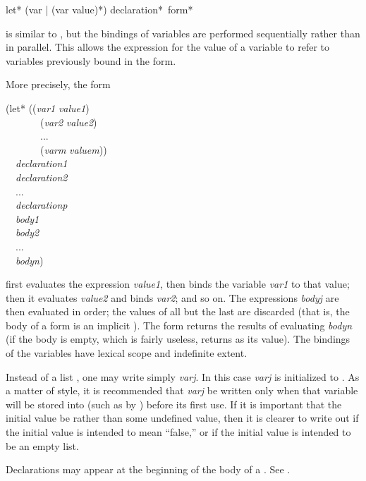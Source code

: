 \begin{defspec}
let* ({var | (var value)}*) {declaration}* {\,form}*

 is similar to , but the bindings of variables
are performed sequentially rather than in parallel.  This allows
the expression for the value of a variable to refer to variables
previously bound in the  form.

More precisely, the form
\begin{lisp}
(let* ((\emph{var1} \emph{value1}) \\
~~~~~~~(\emph{var2} \emph{value2}) \\
~~~~~~~... \\
~~~~~~~(\emph{varm} \emph{valuem})) \\
~~\emph{declaration1} \\
~~\emph{declaration2} \\
~~... \\
~~\emph{declarationp} \\
~~\emph{body1} \\
~~\emph{body2} \\
~~... \\
~~\emph{bodyn})
\end{lisp}
first evaluates the expression \emph{value1}, then binds the variable
\emph{var1} to that value; then it evaluates \emph{value2} and binds \emph{var2};
and so on.
The expressions \emph{bodyj} are then evaluated
in order; the values of all but the last are discarded
(that is, the body of a  form is an implicit ).
The  form returns the results of evaluating \emph{bodyn} (if the
body is empty, which is fairly useless,  returns {\false} as its value).
The bindings of the variables have lexical scope and indefinite extent.

Instead of a list , one may write simply \emph{varj}.
In this case \emph{varj} is initialized to {\false}.  As a matter of style,
it is recommended that \emph{varj} be written only when that variable
will be stored into (such as by ) before its first use.
If it is important that the initial value be {\nil} rather than
some undefined value, then it is clearer to write out
 if the initial value is intended to mean ``false,'' or
 if the initial value is intended to be an empty
list.

Declarations may appear at the beginning of the body of a .
See .


\end{defspec}
